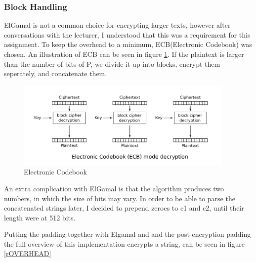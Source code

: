 \documentclass{article}
\begin{document}
\subsubsection{Block Handling}

ElGamal is not a common choice for encrypting larger texts, however after conversations with the lecturer, I understood that this was a requirement for this assignment. To keep the overhead to a minimum, ECB(Electronic Codebook) was chosen. An illustration of ECB can be seen in figure \ref{rECB}. If the plaintext is larger than the number of bits of P, we divide it up into blocks, encrypt them seperately, and concatenate them. 
\begin{figure}[H]
 \centering
  \includegraphics[width=300pt]{img/ECB.png}
 \caption{Electronic Codebook\cite{ECB}}
 \label{rECB}
 \end{figure}

An extra complication with ElGamal is that the algorithm produces two numbers, in which the size of bits may vary. In order to be able to parse the concatenated strings later, I decided to prepend zeroes to c1 and c2, until their length were at 512 bits.

Putting the padding together with Elgamal and and the post-encryption padding the full overview of this implementation encrypts a string, can be seen in figure \ref{rOVERHEAD}
\end{document}
